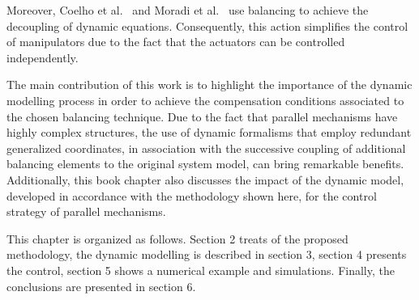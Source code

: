 Moreover, Coelho et al.~\cite{15coelho} and Moradi et al.~\cite{16moradi} use balancing to achieve the decoupling of dynamic equations. Consequently, this action simplifies the control of manipulators due to the fact that the 
actuators can be controlled independently. 

The main contribution of this work is to highlight the importance of the dynamic modelling 
process in order to achieve the compensation conditions associated to the chosen 
balancing technique. Due to the fact that parallel mechanisms have highly complex structures,
the use of dynamic formalisms that employ redundant generalized coordinates,
in association with the successive coupling of additional balancing elements 
to the original system model, can bring remarkable benefits.
Additionally, this book chapter also discusses the impact of
the dynamic model, developed in accordance with the methodology shown here, for the 
control strategy of parallel mechanisms.

This chapter is organized as follows. Section 2 treats of the proposed methodology, the dynamic modelling is described in section 3, section 4 presents the control, section 5 shows a numerical example and simulations. Finally, the conclusions are presented in section 6.


